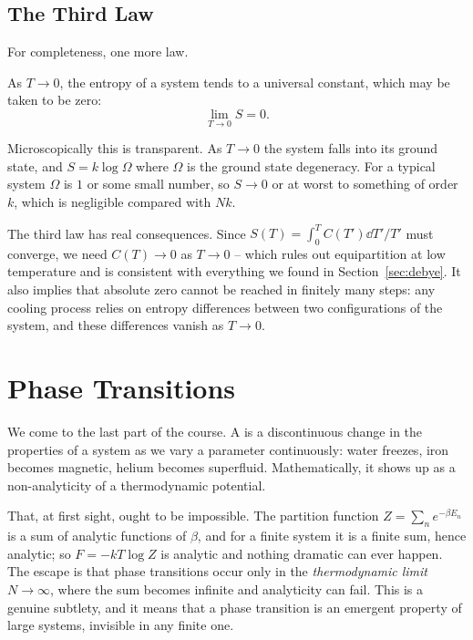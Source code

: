 \subsection{The Third Law}

For completeness, one more law.

\begin{law}
	As $T \to 0$, the entropy of a system tends to a universal constant, which may be taken to be zero:
	$$
	\lim_{T\to 0}S = 0.
	$$
\end{law}

Microscopically this is transparent. As $T \to 0$ the system falls into its ground state, and $S = k\log\Omega$ where $\Omega$ is the ground state degeneracy. For a typical system $\Omega$ is $1$ or some small number, so $S \to 0$ or at worst to something of order $k$, which is negligible compared with $Nk$.

The third law has real consequences. Since $S(T) = \int_0^T C(T')\dd T'/T'$ must converge, we need $C(T) \to 0$ as $T \to 0$ -- which rules out equipartition at low temperature and is consistent with everything we found in Section~\ref{sec:debye}. It also implies that absolute zero cannot be reached in finitely many steps: any cooling process relies on entropy differences between two configurations of the system, and these differences vanish as $T\to0$.

\section{Phase Transitions}

We come to the last part of the course. A  is a discontinuous change in the properties of a system as we vary a parameter continuously: water freezes, iron becomes magnetic, helium becomes superfluid. Mathematically, it shows up as a non-analyticity of a thermodynamic potential.

That, at first sight, ought to be impossible. The partition function $Z = \sum_n e^{-\beta E_n}$ is a sum of analytic functions of $\beta$, and for a finite system it is a finite sum, hence analytic; so $F = -kT\log Z$ is analytic and nothing dramatic can ever happen. The escape is that phase transitions occur only in the \emph{thermodynamic limit} $N \to \infty$, where the sum becomes infinite and analyticity can fail. This is a genuine subtlety, and it means that a phase transition is an emergent property of large systems, invisible in any finite one.

